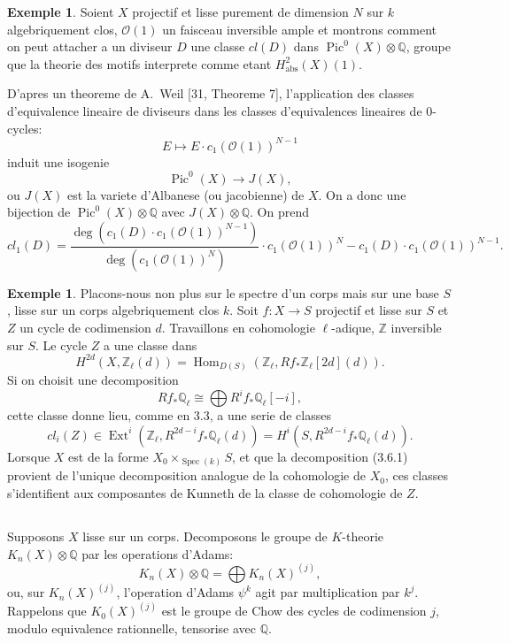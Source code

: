 \documentclass[11pt,a4paper]{article}
\theoremstyle{plain}
\theoremstyle{definition}
\newtheorem{example}[theorem]{Exemple}
\DeclareMathOperator{\Ext}{Ext}
\DeclareMathOperator{\Hom}{Hom}
\DeclareMathOperator{\Spec}{Spec}
\DeclareMathOperator{\Pic}{Pic}
\newcommand{\Q}{\mathbb{Q}}
\newcommand{\Z}{\mathbb{Z}}
\newcommand{\abs}{\mathrm{abs}}
\begin{document}
\begin{example}
Soient $X$ projectif et lisse purement de dimension $N$ sur $k$ algebriquement clos, $\mathcal{O}(1)$ un faisceau inversible ample et montrons comment on peut attacher a un diviseur $D$ une classe $cl(D)$ dans $\Pic^0(X) \otimes \Q$, groupe que la theorie des motifs interprete comme etant $H^{2}_{\abs}(X)(1)$.

D'apres un theoreme de A.~Weil [31, Theoreme 7], l'application des classes d'equivalence lineaire de diviseurs dans les classes d'equivalences lineaires de 0-cycles:
$$
E \mapsto E \cdot c_1(\mathcal{O}(1))^{N-1}
$$
induit une isogenie
$$
\Pic^0(X) \to J(X),
$$
ou $J(X)$ est la variete d'Albanese (ou jacobienne) de $X$. On a donc une bijection de $\Pic^0(X) \otimes \Q$ avec $J(X) \otimes \Q$. On prend
$$
cl_1(D) = \frac{\deg(c_1(D) \cdot c_1(\mathcal{O}(1))^{N-1})}{\deg(c_1(\mathcal{O}(1))^N)} \cdot c_1(\mathcal{O}(1))^N - c_1(D) \cdot c_1(\mathcal{O}(1))^{N-1}.
$$
\end{example}

\begin{example}
Placons-nous non plus sur le spectre d'un corps mais sur une base $S$, lisse sur un corps algebriquement clos $k$. Soit $f: X \to S$ projectif et lisse sur $S$ et $Z$ un cycle de codimension $d$. Travaillons en cohomologie $\ell$-adique, $\Z$ inversible sur $S$. Le cycle $Z$ a une classe dans
$$
H^{2d}(X, \Z_\ell(d)) = \Hom_{D(S)}(\Z_\ell, Rf_* \Z_\ell[2d](d)).
$$
Si on choisit une decomposition
\begin{equation}
\tag{3.6.1}
Rf_* \Q_\ell \cong \bigoplus R^i f_* \Q_\ell[-i],
\end{equation}
cette classe donne lieu, comme en 3.3, a une serie de classes
\begin{equation}
\tag{3.6.2}
cl_i(Z) \in \Ext^i(\Z_\ell, R^{2d-i} f_* \Q_\ell(d)) = H^i(S, R^{2d-i} f_* \Q_\ell(d)).
\end{equation}
Lorsque $X$ est de la forme $X_0 \times_{\Spec(k)} S$, et que la decomposition (3.6.1) provient de l'unique decomposition analogue de la cohomologie de $X_0$, ces classes s'identifient aux composantes de Kunneth de la classe de cohomologie de $Z$.
\end{example}

\subsection{}

Supposons $X$ lisse sur un corps. Decomposons le groupe de $K$-theorie $K_n(X) \otimes \Q$ par les operations d'Adams:
$$
K_n(X) \otimes \Q = \bigoplus K_n(X)^{(j)},
$$
ou, sur $K_n(X)^{(j)}$, l'operation d'Adams $\psi^k$ agit par multiplication par $k^j$. Rappelons que $K_0(X)^{(j)}$ est le groupe de Chow des cycles de codimension $j$, modulo equivalence rationnelle, tensorise avec $\Q$.
\end{document}
